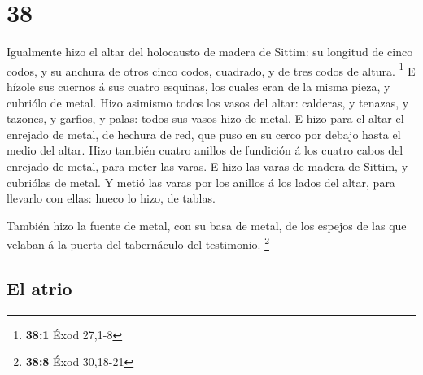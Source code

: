 \hypertarget{section-37}{%
\section{38}\label{section-37}}

 Igualmente hizo el altar del holocausto de madera de
Sittim: su longitud de cinco codos, y su anchura de otros cinco codos,
cuadrado, y de tres codos de altura. \footnote{\textbf{38:1} Éxod 27,1-8}
 E hízole sus cuernos á sus cuatro esquinas, los cuales
eran de la misma pieza, y cubriólo de metal.  Hizo
asimismo todos los vasos del altar: calderas, y tenazas, y tazones, y
garfios, y palas: todos sus vasos hizo de metal.  E hizo
para el altar el enrejado de metal, de hechura de red, que puso en su
cerco por debajo hasta el medio del altar.  Hizo también
cuatro anillos de fundición á los cuatro cabos del enrejado de metal,
para meter las varas.  E hizo las varas de madera de
Sittim, y cubriólas de metal.  Y metió las varas por los
anillos á los lados del altar, para llevarlo con ellas: hueco lo hizo,
de tablas.

 También hizo la fuente de metal, con su basa de metal, de
los espejos de las que velaban á la puerta del tabernáculo del
testimonio. \footnote{\textbf{38:8} Éxod 30,18-21}

\hypertarget{el-atrio}{%
\subsection{El atrio}\label{el-atrio}}

